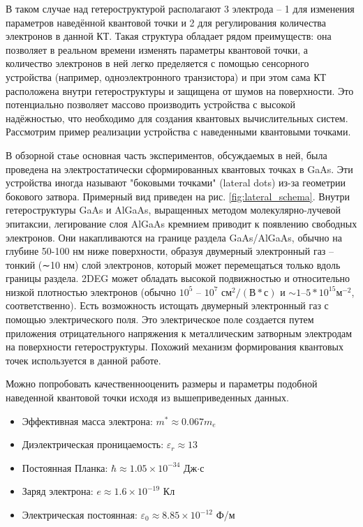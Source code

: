 \documentclass[a4paper,14pt]{extreport} %
\begin{document}
В таком случае над гетероструктурой располагают 3 электрода – 1 для изменения параметров наведённой квантовой точки и 2 для регулирования количества электронов в данной КТ. Такая структура обладает рядом преимуществ: она позволяет в реальном времени изменять параметры квантовой точки, а количество электронов в ней легко пределяется с помощью сенсорного устройства (например, одноэлектронного транзистора) и при этом сама КТ расположена внутри гетероструктуры и защищена от шумов на поверхности. Это потенциально позволяет массово производить устройства с высокой надёжностью, что необходимо для создания квантовых вычислительных систем. Рассмотрим пример реализации устройства с наведенными квантовыми точками.

В обзорной стаье \cite{ref:Hanson2007} основная часть экспериментов, обсуждаемых в ней,
была проведена на электростатически сформированных квантовых точках
в GaAs. Эти устройства иногда называют
"боковыми точками" (lateral dots) из-за геометрии бокового затвора. Примерный вид приведен на рис. \ref{fig:lateral_schema}. Внутри гетероструктуры GaAs и AlGaAs, выращенных методом молекулярно-лучевой эпитаксии, легирование слоя AlGaAs кремнием приводит к появлению свободных электронов. Они накапливаются на границе раздела GaAs/AlGaAs, обычно на глубине 50-100 нм ниже поверхности, образуя двумерный электронный газ – тонкий (∼10 нм) слой электронов, который может перемещаться только вдоль границы раздела. 2DEG может обладать высокой подвижностью и относительно низкой плотностью электронов (обычно $10^5$ – $10^7$ $см^2/(В*с)$ и $ \sim 1–5 * 10^{15} м^{-2}$, соответственно). Есть возможность истощать двумерный электронный газ с помощью электрического поля. Это электрическое поле создается путем приложения отрицательного напряжения к металлическим затворным электродам на поверхности гетероструктуры. Похожий механизм формирования квантовых точек используется в данной работе.

Можно попробовать качественнооценить размеры и параметры подобной наведенной квантовой точки исходя из вышеприведенных данных.

\begin{itemize}
    \item Эффективная масса электрона: $m^* \approx 0.067 m_e$
    \item Диэлектрическая проницаемость: $\varepsilon_r \approx 13$
    \item Постоянная Планка: $\hbar \approx 1.05 \times 10^{-34}$ Дж$\cdot$с
    \item Заряд электрона: $e \approx 1.6 \times 10^{-19}$ Кл
    \item Электрическая постоянная: $\varepsilon_0 \approx 8.85 \times 10^{-12}$ Ф/м
\end{itemize}
\end{document}
